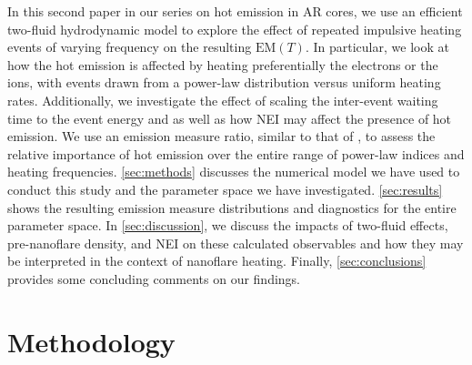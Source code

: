 \documentclass[apj]{emulateapj}
\begin{document}
	\par In this second paper in our series on hot emission in AR cores, we use an efficient two-fluid hydrodynamic model to explore the effect of repeated impulsive heating events of varying frequency on the resulting $\mathrm{EM}(T)$. In particular, we look at how the hot emission is affected by heating preferentially the electrons or the ions, with events drawn from a power-law distribution versus uniform heating rates. Additionally, we investigate the effect of scaling the inter-event waiting time to the event energy and as well as how NEI may affect the presence of hot emission. We use an emission measure ratio, similar to that of \citet{brosius_pervasive_2014}, to assess the relative importance of hot emission over the entire range of power-law indices and heating frequencies. \autoref{sec:methods} discusses the numerical model we have used to conduct this study and the parameter space we have investigated. \autoref{sec:results} shows the resulting emission measure distributions and diagnostics for the entire parameter space. In \autoref{sec:discussion}, we discuss the impacts of two-fluid effects, pre-nanoflare density, and NEI on these calculated observables and how they may be interpreted in the context of nanoflare heating. Finally, \autoref{sec:conclusions} provides some concluding comments on our findings.
	\section{Methodology}
	\label{sec:methods}
\end{document}
